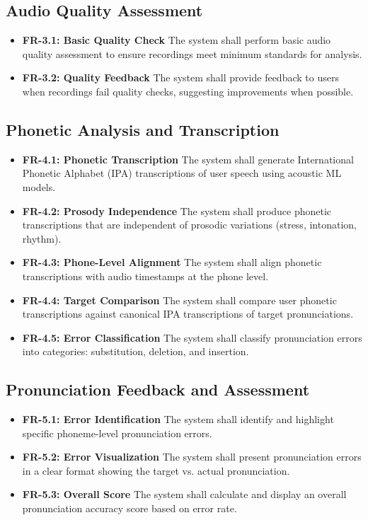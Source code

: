 \documentclass[a4paper,12pt]{report}
\begin{document}
\subsection{Audio Quality Assessment}
\begin{itemize}
    \item \textbf{FR-3.1: Basic Quality Check} The system shall perform basic audio quality assessment to ensure recordings meet minimum standards for analysis.
    \item \textbf{FR-3.2: Quality Feedback} The system shall provide feedback to users when recordings fail quality checks, suggesting improvements when possible.
\end{itemize}

\subsection{Phonetic Analysis and Transcription}
\begin{itemize}
    \item \textbf{FR-4.1: Phonetic Transcription} The system shall generate International Phonetic Alphabet (IPA) transcriptions of user speech using acoustic ML models.
    \item \textbf{FR-4.2: Prosody Independence} The system shall produce phonetic transcriptions that are independent of prosodic variations (stress, intonation, rhythm).
    \item \textbf{FR-4.3: Phone-Level Alignment} The system shall align phonetic transcriptions with audio timestamps at the phone level.
    \item \textbf{FR-4.4: Target Comparison} The system shall compare user phonetic transcriptions against canonical IPA transcriptions of target pronunciations.
    \item \textbf{FR-4.5: Error Classification} The system shall classify pronunciation errors into categories: substitution, deletion, and insertion.
\end{itemize}

\subsection{Pronunciation Feedback and Assessment}
\begin{itemize}
    \item \textbf{FR-5.1: Error Identification} The system shall identify and highlight specific phoneme-level pronunciation errors.
    \item \textbf{FR-5.2: Error Visualization} The system shall present pronunciation errors in a clear format showing the target vs. actual pronunciation.
    \item \textbf{FR-5.3: Overall Score} The system shall calculate and display an overall pronunciation accuracy score based on error rate.
\end{itemize}
\end{document}
